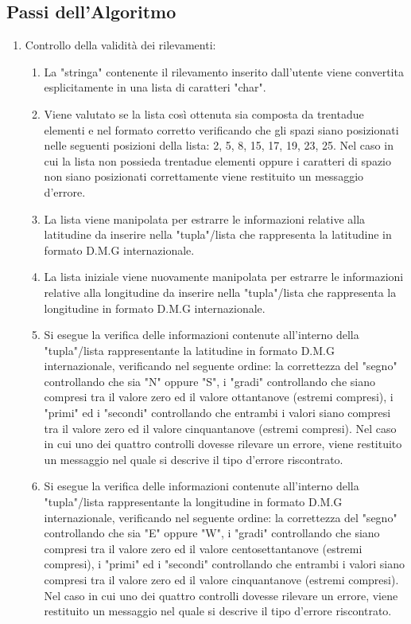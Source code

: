 \documentclass{article}
\begin{document}
\subsection{Passi dell'Algoritmo}
\begin{enumerate}
	
	\item Controllo della validità dei rilevamenti:
	\begin{enumerate}
		\item La "stringa" contenente il rilevamento inserito dall'utente viene convertita esplicitamente in una lista di caratteri "char".
		\item Viene valutato se la lista così ottenuta sia composta da trentadue elementi e nel formato corretto verificando che gli spazi siano posizionati nelle  seguenti posizioni della lista: 2, 5, 8, 15, 17, 19, 23, 25. Nel caso in cui la lista non possieda trentadue elementi oppure i caratteri di spazio non siano posizionati correttamente viene restituito un messaggio d'errore.
		\item La lista viene manipolata per estrarre le informazioni relative alla latitudine da inserire nella "tupla"/lista che rappresenta la latitudine in formato D.M.G internazionale.
		\item La lista iniziale viene nuovamente manipolata per estrarre le informazioni relative alla longitudine da inserire nella "tupla"/lista che rappresenta la longitudine in formato D.M.G internazionale.
		\item Si esegue la verifica delle informazioni contenute all'interno della "tupla"/lista rappresentante la latitudine in formato D.M.G internazionale, verificando nel seguente ordine:  la correttezza del "segno" controllando che sia "N" oppure "S", i "gradi" controllando che siano compresi tra il valore zero ed il valore ottantanove (estremi compresi), i "primi" ed i "secondi" controllando che entrambi i valori siano compresi tra il valore zero ed il valore cinquantanove (estremi compresi). Nel caso in cui uno dei quattro controlli dovesse rilevare un errore, viene restituito un messaggio nel quale si descrive il tipo d'errore riscontrato.
		\item Si esegue la verifica delle informazioni contenute all'interno della "tupla"/lista rappresentante la longitudine in formato D.M.G internazionale, verificando nel seguente ordine:  la correttezza del "segno" controllando che sia "E" oppure "W", i "gradi" controllando che siano compresi tra il valore zero ed il valore centosettantanove (estremi compresi), i "primi" ed i "secondi" controllando che entrambi i valori siano compresi tra il valore zero ed il valore cinquantanove (estremi compresi). Nel caso in cui uno dei quattro controlli dovesse rilevare un errore, viene restituito un messaggio nel quale si descrive il tipo d'errore riscontrato.
	\end{enumerate}


\end{enumerate}
\end{document}
